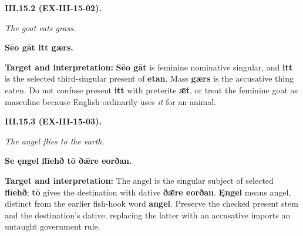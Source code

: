 \par\begin{minipage}{\linewidth}\raggedright
\textbf{III.15.2 (EX-III-15-02).}

\emph{The goat eats grass.}

\textbf{Sēo gāt itt gærs.}

\textbf{Target and interpretation:} \textbf{Sēo gāt} is feminine nominative singular, and \textbf{itt} is the selected third-singular present of \textbf{etan}. Mass \textbf{gærs} is the accusative thing eaten. Do not confuse present \textbf{itt} with preterite \textbf{ǣt}, or treat the feminine goat as masculine because English ordinarily uses \emph{it} for an animal.

\end{minipage}\par\addvspace{4pt}

\par\begin{minipage}{\linewidth}\raggedright
\textbf{III.15.3 (EX-III-15-03).}

\emph{The angel flies to the earth.}

\textbf{Se ęngel flīehð tō ðǣre eorðan.}

\textbf{Target and interpretation:} The angel is the singular subject of selected \textbf{flīehð}; \textbf{tō} gives the destination with dative \textbf{ðǣre eorðan}. \textbf{Ęngel} means angel, distinct from the earlier fish-hook word \textbf{angel}. Preserve the checked present stem and the destination's dative; replacing the latter with an accusative imports an untaught government rule.

\end{minipage}\par\addvspace{4pt}

